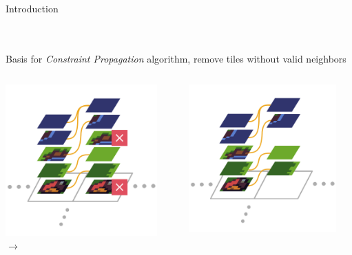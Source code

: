 \documentclass{beamer}
\begin{document}
  \begin{frame}[fragile]{Introduction}

    \hfill \\
    \hfill \\

    Basis for \textit{Constraint Propagation} algorithm,
    remove tiles without valid neighbors

    \begin{columns}[T,onlytextwidth]
        \begin{block}{}
          \includegraphics[width=0.9\textwidth]{figs/ac_illustration_inconsistent.pdf} $\to$
        \end{block}
        \begin{block}{}
          \includegraphics[width=0.9\textwidth]{figs/ac_illustration_consistent.pdf}
        \end{block}
    \end{columns}

  \end{frame}
\end{document}

